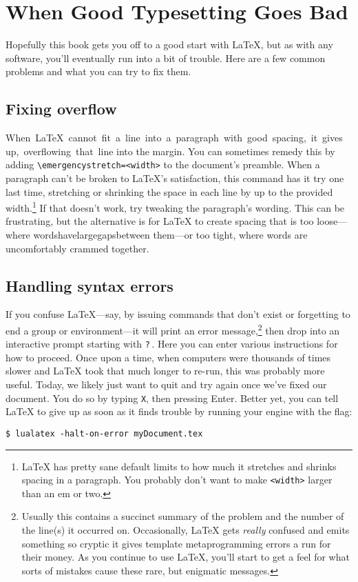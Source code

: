 \chapter{When Good Typesetting Goes Bad}

Hopefully this book gets you off to a good start with \LaTeX,
but as with any software, you'll eventually run into a bit of trouble.
Here are a few common problems and what you can try to fix them.

\section{Fixing overflow}

\mbox{When \LaTeX{} cannot fit a line into a paragraph with good spacing,
it gives up, overflowing that line}
into the margin.
You can sometimes remedy this by adding
\verb|\emergencystretch=<width>| to the document's preamble.
When a paragraph can't be broken to \LaTeX's satisfaction,
this command has it try one last time,
stretching or shrinking the space in each line by up to the provided
width.\punckern\footnote{\LaTeX{} has pretty sane default limits to how much
it stretches and shrinks spacing in a paragraph.
You probably don't want to make \texttt{<width>} larger than an em or two.}
If that doesn't work, try tweaking the paragraph's wording.
This can be frustrating, but the alternative is for \LaTeX{} to create spacing
that is too loose---where\enspace
words\enspace have\enspace large\quad gaps\enspace between\enspace
them---or too tight, where\! words\! are\! uncomfortably\! crammed\! together.

\section{Handling syntax errors}
If you confuse \LaTeX{}---say, by issuing commands that don't exist or
forgetting to end a group or environment---it will print an
error message,\punckern\footnote{Usually this contains a succinct summary of
the problem and the number of the line(s) it occurred on. Occasionally,
\LaTeX{} gets \emph{really} confused and emits something so cryptic it gives
\cpp{} template metaprogramming errors a run for their money.
As you continue to use \LaTeX, you'll start to get a feel for what sorts of
mistakes cause these rare, but enigmatic messages.}
then drop into an interactive prompt starting with \texttt{?}\,.
Here you can enter various instructions for how to proceed.
Once upon a time, when computers were thousands of times slower and
\LaTeX{} took that much longer to re-run, this was probably more useful.
Today, we likely just want to quit and try again once we've fixed our document.
You do so by typing \texttt{X}, then pressing Enter.
Better yet, you can tell \LaTeX{} to give up as soon as it finds trouble
by running your engine with the  flag:
\begin{leftfigure}
\begin{lstlisting}
$ lualatex -halt-on-error myDocument.tex
\end{lstlisting}
\end{leftfigure}
